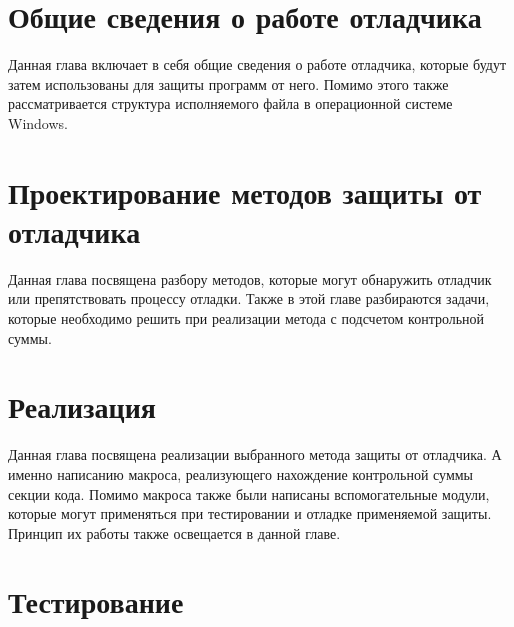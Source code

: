 %



  \newpage

  \tableofcontents
  \newpage

  \chapter{Общие сведения о работе отладчика}
  Данная глава включает в себя общие сведения о работе отладчика, которые будут
  затем использованы для защиты программ от него. Помимо этого также
  рассматривается структура исполняемого файла в операционной системе Windows.
  
  
  
  
  

  \chapter{Проектирование методов защиты от отладчика}
  Данная глава посвящена разбору методов, которые могут обнаружить отладчик или
  препятствовать процессу отладки. Также в этой главе разбираются задачи,
  которые необходимо решить при реализации метода с подсчетом контрольной суммы.
  
  
  
  
  

  \chapter{Реализация}
  Данная глава посвящена реализации выбранного метода защиты от отладчика. А
  именно написанию макроса, реализующего нахождение контрольной суммы секции
  кода. Помимо макроса также были написаны вспомогательные модули, которые
  могут применяться при тестировании и отладке применяемой защиты. Принцип их
  работы также освещается в данной главе.
  
  
  

  \chapter{Тестирование}
  

